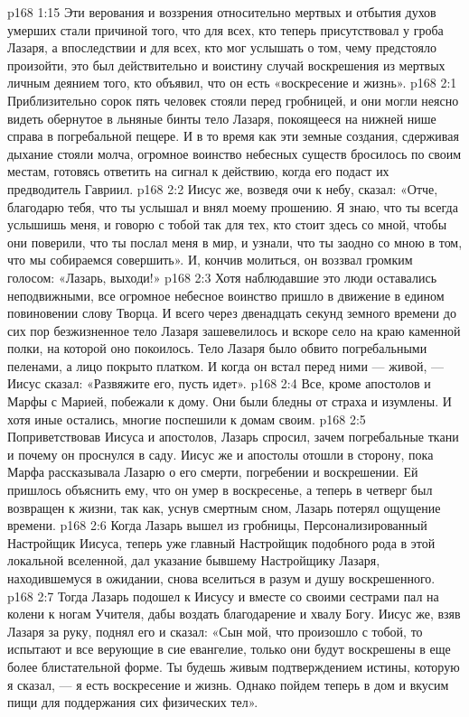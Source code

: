 \vs p168 1:15 Эти верования и воззрения относительно мертвых и отбытия духов умерших стали причиной того, что для всех, кто теперь присутствовал у гроба Лазаря, а впоследствии и для всех, кто мог услышать о том, чему предстояло произойти, это был действительно и воистину случай воскрешения из мертвых личным деянием того, кто объявил, что он есть «воскресение и жизнь».
\vs p168 2:1 Приблизительно сорок пять человек стояли перед гробницей, и они могли неясно видеть обернутое в льняные бинты тело Лазаря, покоящееся на нижней нише справа в погребальной пещере. И в то время как эти земные создания, сдерживая дыхание стояли молча, огромное воинство небесных существ бросилось по своим местам, готовясь ответить на сигнал к действию, когда его подаст их предводитель Гавриил.
\vs p168 2:2 Иисус же, возведя очи к небу, сказал: «Отче, благодарю тебя, что ты услышал и внял моему прошению. Я знаю, что ты всегда услышишь меня, и говорю с тобой так для тех, кто стоит здесь со мной, чтобы они поверили, что ты послал меня в мир, и узнали, что ты заодно со мною в том, что мы собираемся совершить». И, кончив молиться, он воззвал громким голосом: «Лазарь, выходи!»
\vs p168 2:3 Хотя наблюдавшие это люди оставались неподвижными, все огромное небесное воинство пришло в движение в едином повиновении слову Творца. И всего через двенадцать секунд земного времени до сих пор безжизненное тело Лазаря зашевелилось и вскоре село на краю каменной полки, на которой оно покоилось. Тело Лазаря было обвито погребальными пеленами, а лицо покрыто платком. И когда он встал перед ними --- живой, --- Иисус сказал: «Развяжите его, пусть идет».
\vs p168 2:4 Все, кроме апостолов и Марфы с Марией, побежали к дому. Они были бледны от страха и изумлены. И хотя иные остались, многие поспешили к домам своим.
\vs p168 2:5 Поприветствовав Иисуса и апостолов, Лазарь спросил, зачем погребальные ткани и почему он проснулся в саду. Иисус же и апостолы отошли в сторону, пока Марфа рассказывала Лазарю о его смерти, погребении и воскрешении. Ей пришлось объяснить ему, что он умер в воскресенье, а теперь в четверг был возвращен к жизни, так как, уснув смертным сном, Лазарь потерял ощущение времени.
\vs p168 2:6 \pc Когда Лазарь вышел из гробницы, Персонализированный Настройщик Иисуса, теперь уже главный Настройщик подобного рода в этой локальной вселенной, дал указание бывшему Настройщику Лазаря, находившемуся в ожидании, снова вселиться в разум и душу воскрешенного.
\vs p168 2:7 \pc Тогда Лазарь подошел к Иисусу и вместе со своими сестрами пал на колени к ногам Учителя, дабы воздать благодарение и хвалу Богу. Иисус же, взяв Лазаря за руку, поднял его и сказал: «Сын мой, что произошло с тобой, то испытают и все верующие в сие евангелие, только они будут воскрешены в еще более блистательной форме. Ты будешь живым подтверждением истины, которую я сказал, --- я есть воскресение и жизнь. Однако пойдем теперь в дом и вкусим пищи для поддержания сих физических тел».
